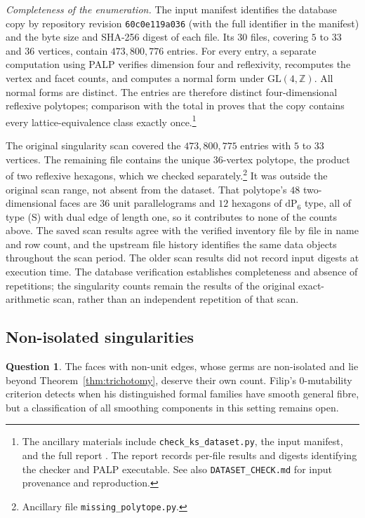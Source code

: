 \documentclass[11pt]{amsart}
\theoremstyle{definition}
\newtheorem{question}[theorem]{Question}
\theoremstyle{remark}
\newcommand{\ZZ}{\mathbb{Z}}
\begin{document}
\emph{Completeness of the enumeration.}  The input manifest identifies
the database copy by repository revision \texttt{60c0e119a036} (with the
full identifier in the manifest) and the byte size and SHA-256 digest of
each file.  Its $30$ files, covering $5$ to $33$ and $36$ vertices,
contain $473{,}800{,}776$ entries.  For every entry, a separate computation
using PALP \cite{PALP} verifies dimension four and reflexivity, recomputes
the vertex and facet counts, and computes a normal form under
$\mathrm{GL}(4,\ZZ)$.  All normal forms are distinct.  The entries are
therefore distinct four-dimensional reflexive polytopes; comparison with
the total in \cite{KreuzerSkarke00} proves that the copy contains every
lattice-equivalence class exactly once.\footnote{The ancillary materials
include \texttt{check\_ks\_dataset.py}, the input manifest, and the full
report .  The report records
per-file results and digests identifying the checker and PALP executable.
See also \texttt{DATASET\_CHECK.md} for input provenance and reproduction.}

The original singularity scan covered the $473{,}800{,}775$ entries with
$5$ to $33$ vertices.  The remaining file contains the unique
$36$-vertex polytope, the product of two reflexive hexagons, which we
checked separately.\footnote{Ancillary file \texttt{missing\_polytope.py}.}
It was outside the original scan range, not absent from the dataset.  That
polytope's $48$ two-dimensional faces are $36$ unit parallelograms and
$12$ hexagons of $\mathrm{dP}_6$ type, all of type \textup{(S)} with dual
edge of length one, so it contributes to none of the counts above.
The saved scan results agree with the verified inventory file by file in
name and row count, and the upstream file history identifies the same
data objects throughout the scan period.  The older scan results did not
record input digests at execution time.  The database verification
establishes completeness and absence of repetitions; the singularity
counts remain the results of the original exact-arithmetic scan, rather
than an independent repetition of that scan.

\subsection{Non-isolated singularities}

\begin{question}
The faces with non-unit edges, whose germs are non-isolated and lie beyond
Theorem~\ref{thm:trichotomy}, deserve their own count.  Filip's
$0$-mutability criterion \cite{Filip25} detects when his distinguished formal
families have smooth general fibre, but a classification of all smoothing
components in this setting remains open.
\end{question}
\end{document}
